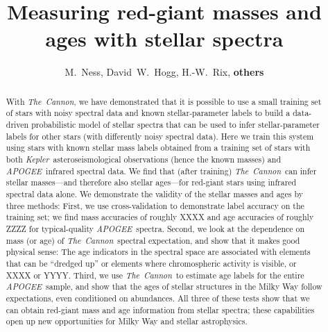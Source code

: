 \documentclass[12pt, preprint]{aastex}
\newcommand{\project}[1]{\textsl{#1}}
\newcommand{\thecannon}{\project{The~Cannon}}
\newcommand{\apogee}{\project{APOGEE}}
\newcommand{\kepler}{\project{Kepler}}
\begin{document}
\title{Measuring red-giant masses and ages with stellar spectra}
\author{M.~Ness,
David~W.~Hogg,
H.-W.~Rix,
\textbf{others}}

\begin{abstract}%
With \thecannon, we have demonstrated that it is possible to use a
small training set of stars with noisy spectral data and known
stellar-parameter labels to build a data-driven probabilistic model of
stellar spectra that can be used to infer stellar-parameter labels for
other stars (with differently noisy spectral data).
Here we train this system using stars with known stellar mass labels
obtained from a training set of stars with both
\kepler\ asteroseismological observations (hence the known masses) and
\apogee\ infrared spectral data.
We find that (after training) \thecannon\ can infer stellar
masses---and therefore also stellar ages---for red-giant stars using
infrared spectral data alone.
We demonstrate the validity of the stellar masses and ages by three
methods:
First, we use cross-validation to demonstrate label accuracy on the
training set; we find mass accuracies of roughly XXXX and age accuracies
of roughly ZZZZ for typical-quality \apogee\ spectra.
Second, we look at the dependence on mass (or age) of
\thecannon\ spectral expectation, and show that it makes good physical
sense:
The age indicators in the spectral space are associated with elements
that can be ``dredged up'' or elements where chromospheric activity is
visible, or XXXX or YYYY.
Third, we use \thecannon\ to estimate age labels for the entire
\apogee\ sample, and show that the ages of stellar structures in the
Milky Way follow expectations, even conditioned on abundances.
All three of these tests show that we can obtain red-giant mass and
age information from stellar spectra; these capabilities open up new
opportunities for Milky Way and stellar astrophysics.
\end{abstract}
\end{document}
